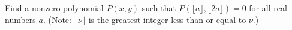 Find a nonzero polynomial $P(x,y)$ such that $P(\lfloor a \rfloor,
\lfloor 2a \rfloor) = 0$ for all real numbers $a$.
(Note: $\lfloor \nu \rfloor$ is the greatest integer less than
or equal to $\nu$.)
